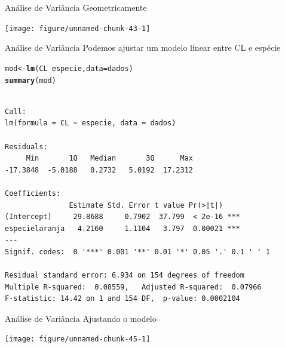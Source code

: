 \documentclass[10pt]{beamer}\usepackage[]{graphicx}\usepackage[]{color}
\makeatletter
\newcommand{\hlopt}[1]{\textcolor[rgb]{0,0,0}{#1}}%
\newcommand{\hlstd}[1]{\textcolor[rgb]{0.345,0.345,0.345}{#1}}%
\newcommand{\hlkwb}[1]{\textcolor[rgb]{0.69,0.353,0.396}{#1}}%
\newcommand{\hlkwc}[1]{\textcolor[rgb]{0.333,0.667,0.333}{#1}}%
\newcommand{\hlkwd}[1]{\textcolor[rgb]{0.737,0.353,0.396}{\textbf{#1}}}%
\newenvironment{kframe}{%
 \def\at@end@of@kframe{}%
 \ifinner\ifhmode%
  \def\at@end@of@kframe{\end{minipage}}%
  \begin{minipage}{\columnwidth}%
 \fi\fi%
 \def\FrameCommand##1{\hskip\@totalleftmargin \hskip-\fboxsep
 \colorbox{shadecolor}{##1}\hskip-\fboxsep
     \hskip-\linewidth \hskip-\@totalleftmargin \hskip\columnwidth}%
 \MakeFramed {\advance\hsize-\width
   \@totalleftmargin\z@ \linewidth\hsize
   \@setminipage}}%
 {\par\unskip\endMakeFramed%
 \at@end@of@kframe}
\newenvironment{knitrout}{}{} %
\theoremstyle{definition}
\makeatother
\begin{document}
\begin{frame}[fragile=singleslide]{Análise de Variância}
Geometricamente
\begin{knitrout}\small
{}\color{fgcolor}

{\centering \texttt{[image: figure/unnamed-chunk-43-1]} 

}



\end{knitrout}
\end{frame}

\begin{frame}[fragile=singleslide]{Análise de Variância}
Podemos ajustar um modelo linear entre CL e espécie
\begin{knitrout}\footnotesize
{}\color{fgcolor}\begin{kframe}
\begin{alltt}
\hlstd{mod} \hlkwb{<-} \hlkwd{lm}\hlstd{(CL} \hlopt{~} \hlstd{especie,} \hlkwc{data} \hlstd{= dados)}
\hlkwd{summary}\hlstd{(mod)}
\end{alltt}
\begin{verbatim}

Call:
lm(formula = CL ~ especie, data = dados)

Residuals:
     Min       1Q   Median       3Q      Max 
-17.3848  -5.0188   0.2732   5.0192  17.2312 

Coefficients:
               Estimate Std. Error t value Pr(>|t|)    
(Intercept)     29.8688     0.7902  37.799  < 2e-16 ***
especielaranja   4.2160     1.1104   3.797  0.00021 ***
---
Signif. codes:  0 '***' 0.001 '**' 0.01 '*' 0.05 '.' 0.1 ' ' 1

Residual standard error: 6.934 on 154 degrees of freedom
Multiple R-squared:  0.08559,	Adjusted R-squared:  0.07966 
F-statistic: 14.42 on 1 and 154 DF,  p-value: 0.0002104
\end{verbatim}
\end{kframe}
\end{knitrout}
\end{frame}

\begin{frame}[fragile=singleslide]{Análise de Variância}
Ajustando o modelo
\begin{knitrout}\small
{}\color{fgcolor}

{\centering \texttt{[image: figure/unnamed-chunk-45-1]} 

}



\end{knitrout}
\end{frame}
\end{document}
